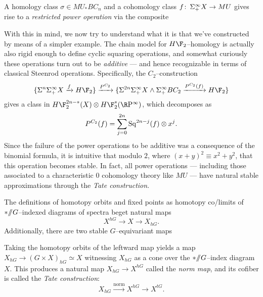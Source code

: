 \begin{definition}
A homology class $\sigma \in MU_* BC_n$ and a cohomology class $f\colon\thinspace \Sigma^\infty_+ X \to MU$ gives rise to a \textit{restricted power operation} via the composite
\begin{center}
\end{center}
\end{definition}

With this in mind, we now try to understand what it is that we've constructed by means of a simpler example.  The chain model for $H\F_2$--homology is actually also rigid enough to define cyclic squaring operations, and somewhat curiously these operations turn out to be \emph{additive} --- and hence recognizable in terms of classical Steenrod operations.  Specifically, the $C_2$--construction \[\{\Susp^n \Susp^\infty_+ X \xrightarrow{f} H\F_2\} \xrightarrow{P^{C_2}} \{\Susp^{2n} \Susp^\infty_+ X \sm \Susp^\infty_+ BC_2 \xrightarrow{P^{C_2}(f)} H\F_2\}\] gives a class in $H\F_2^{2n-*}(X) \otimes H\F_2^*(\RP^\infty)$, which decomposes as \[P^{C_2}(f) = \sum_{j=0}^{2n} \operatorname{Sq}^{2n-j}(f) \otimes x^j.\]  Since the failure of the power operations to be additive was a consequence of the binomial formula, it is intuitive that modulo $2$, where $(x + y)^2 \equiv x^2 + y^2$, that this operation becomes stable.  In fact, all power operations --- including those associated to a characteristic $0$ cohomology theory like $MU$ --- have natural stable approximations through the \textit{Tate construction}.

\begin{definition}
The definitions of homotopy orbits and fixed points as homotopy co/limits of $* /\!\!/ G$--indexed diagrams of spectra beget natural maps \[X^{hG} \to X \to X_{hG}.\]  Additionally, there are two stable $G$--equivariant maps
\begin{center}
\end{center}
Taking the homotopy orbits of the leftward map yields a map $X_{hG} \to (G \times X)_{hG} \simeq X$ witnessing $X_{hG}$ as a cone over the $* /\!\!/ G$--index diagram $X$.  This produces a natural map $X_{hG} \to X^{hG}$ called the \textit{norm map}, and its cofiber is called the \textit{Tate construction}: \[X_{hG} \xrightarrow{\mathrm{norm}} X^{hG} \to X^{tG}.\]
\end{definition}

